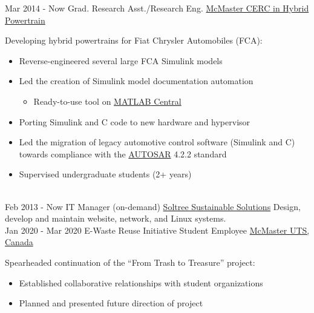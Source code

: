 \documentclass[letterpaper]{twentysecondcv} %
\begin{document}
\vspace{-.5em}
\begin{twenty} %
  \twentyitem
  {Mar 2014 -}
  {Now}
  {Grad. Research Asst./Research Eng.}
  {%
    \href{http://hybrid.mcmaster.ca/}{McMaster CERC in Hybrid Powertrain}}
  {}
  {Developing hybrid powertrains for Fiat Chrysler Automobiles (FCA):
    \begin{itemize}
      \item Reverse-engineered several large FCA Simulink models
      \item Led the creation of Simulink model documentation automation
      \begin{itemize}
        \item Ready-to-use tool on \href{https://www.mathworks.com/matlabcentral/fileexchange/63252-simulink-design-documenter}{\textsc{MATLAB} Central}
      \end{itemize}
      \item Porting Simulink and C code to new hardware and hypervisor
      \item Led the migration of legacy automotive control software (Simulink and C) towards compliance with the \href{https://www.autosar.org/standards/classic-platform/}{AUTOSAR} 4.2.2 standard
      \item Supervised undergraduate students (2+ years)
    \end{itemize}}
  \\
  \twentyitem
  {Feb 2013 -}
  {Now}
  {IT Manager (on-demand)}
  {\href{http://www.soltree.net/}{Soltree Sustainable Solutions}}
  {}
  {Design, develop and maintain website, network, and Linux systems.}
	\\
  \twentyitem
  {Jan 2020 -}
  {Mar 2020}
  {E-Waste Reuse Initiative Student Employee}
  {\href{https://uts.mcmaster.ca/}{McMaster UTS, Canada}}
  {}
  {Spearheaded continuation of the ``From Trash to Treasure'' project:
    \begin{itemize}
      \item Established collaborative relationships with student organizations
      \item Planned and presented future direction of project

\end{itemize}}
\end{twenty}
\end{document}
